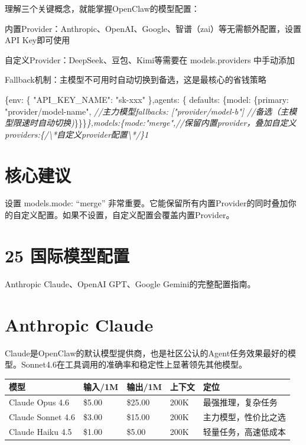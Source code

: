\documentclass[
  10
]{article}
\newenvironment{Shaded}{}{}
\newcommand{\CommentTok}[1]{\textcolor[rgb]{0.38,0.63,0.69}{\textit{#1}}}
\newcommand{\DataTypeTok}[1]{\textcolor[rgb]{0.56,0.13,0.00}{#1}}
\newcommand{\NormalTok}[1]{#1}
\newcommand{\OperatorTok}[1]{\textcolor[rgb]{0.40,0.40,0.40}{#1}}
\newcommand{\RegionMarkerTok}[1]{#1}
\newcommand{\StringTok}[1]{\textcolor[rgb]{0.25,0.44,0.63}{#1}}
\newcounter{none} %
\begin{document}
理解三个关键概念，就能掌握OpenClaw的模型配置：

内置Provider：Anthropic、OpenAI、Google、智谱（zai）等无需额外配置，设置API
Key即可使用

自定义Provider：DeepSeek、豆包、Kimi等需要在 models.providers 中手动添加

Fallback机制：主模型不可用时自动切换到备选，这是最核心的省钱策略

\begin{Shaded}
\begin{Highlighting}[]
\NormalTok{\{}\DataTypeTok{env}\OperatorTok{:}\NormalTok{ \{ }\StringTok{"API\_KEY\_NAME"}\OperatorTok{:} \StringTok{"sk{-}xxx"}\NormalTok{ \}}\OperatorTok{,}\DataTypeTok{agents}\OperatorTok{:}\NormalTok{ \{ }\DataTypeTok{defaults}\OperatorTok{:}\NormalTok{ \{}\DataTypeTok{model}\OperatorTok{:}\NormalTok{ \{}\DataTypeTok{primary}\OperatorTok{:} \StringTok{"provider/model{-}name"}\OperatorTok{,} \CommentTok{//主力模型fallbacks: ["provider/model{-}b"] //备选（主模型限速时自动切换)}\RegionMarkerTok{\}\}\}}\CommentTok{\},models:\{mode:"merge",//保留内置provider，叠加自定义providers:\{/\textbackslash{}*自定义provider配置\textbackslash{}*/\}1}
\end{Highlighting}
\end{Shaded}

\section{核心建议}\label{ux6838ux5fc3ux5efaux8bae-16}

设置 models.mode: ``merge''
非常重要。它能保留所有内置Provider的同时叠加你的自定义配置。如果不设置，自定义配置会覆盖内置Provider。

\section{25 国际模型配置}\label{ux56fdux9645ux6a21ux578bux914dux7f6e}

Anthropic Claude、OpenAI GPT、Google Gemini的完整配置指南。

\section{Anthropic Claude}\label{anthropic-claude}

Claude是OpenClaw的默认模型提供商，也是社区公认的Agent任务效果最好的模型。Sonnet4.6在工具调用的准确率和稳定性上显著领先其他模型。

{\def\LTcaptype{none} %
\begin{longtable}[]{@{}|l|l|l|l|l|@{}}
\toprule\noalign{}
\endhead
\bottomrule\noalign{}
\endlastfoot
\hline
模型 & 输入/1M & 输出/1M & 上下文 & 定位 \\
\hline
Claude Opus 4.6 & \$5.00 & \$25.00 & 200K & 最强推理，复杂任务 \\
\hline
Claude Sonnet 4.6 & \$3.00 & \$15.00 & 200K & 主力模型，性价比之选 \\
\hline
Claude Haiku 4.5 & \$1.00 & \$5.00 & 200K & 轻量任务，高速低成本 \\
\hline
\end{longtable}
}
\end{document}
